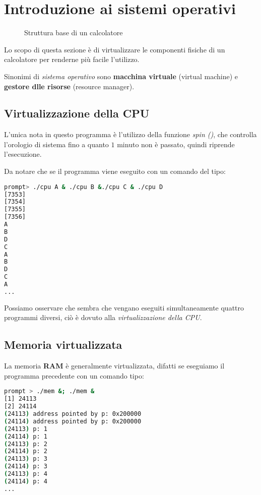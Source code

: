 \chapter{Introduzione ai sistemi operativi}
\begin{figure}[ht]
  \centering
  \caption{Struttura base di un calcolatore}\label{fig:struttura}
\end{figure}

Lo scopo di questa sezione è di virtualizzare le componenti fisiche di un
calcolatore per renderne più facile l'utilizzo.

Sinonimi di \emph{sistema operativo} sono \textbf{macchina virtuale} (virtual
machine) e \textbf{gestore dlle risorse} (resource manager).

\section{Virtualizzazione della CPU}
L'unica nota in questo programma è l'utilizzo della funzione \emph{spin ()}, che
controlla l'orologio di sistema fino a quanto $1$ minuto non è passato, quindi
riprende l'esecuzione.



Da notare che se il programma viene eseguito con un comando del tipo:
\begin{lstlisting}[language=bash,caption=Esecuzione in concorrenza]
prompt> ./cpu A & ./cpu B &./cpu C & ./cpu D
[7353]
[7354]
[7355]
[7356]
A
B
D
C
A
B
D
C
A
...
\end{lstlisting}

Possiamo osservare che sembra che vengano eseguiti simultaneamente quattro
programmi diversi, ciò è dovuto alla \emph{virtualizzazione della CPU}.

\section{Memoria virtualizzata}


La memoria \textbf{RAM} è generalmente virtualizzata, difatti se eseguiamo
il programma precedente con un comando tipo:
\begin{lstlisting}[language=bash,caption=Esecuzione in concorrenza]
prompt > ./mem &; ./mem &
[1] 24113
[2] 24114
(24113) address pointed by p: 0x200000
(24114) address pointed by p: 0x200000
(24113) p: 1
(24114) p: 1
(24113) p: 2
(24114) p: 2
(24113) p: 3
(24114) p: 3
(24113) p: 4
(24114) p: 4
...
\end{lstlisting}

